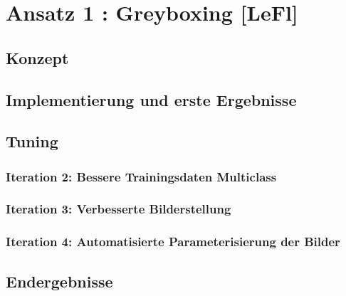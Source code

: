 \chapter{Ansatz 1 : Greyboxing [LeFl]}
\label{Cha:GreyBoxing}
\section{Konzept}

\section{Implementierung und erste Ergebnisse}

\section{Tuning}

\subsection{Iteration 2: Bessere Trainingsdaten Multiclass}

\subsection{Iteration 3: Verbesserte Bilderstellung}

\subsection{Iteration 4: Automatisierte Parameterisierung der Bilder}

\section{Endergebnisse}